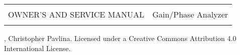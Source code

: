 \begin{titlingpage}
\begin{tabularx}{\textwidth}{Xr}
\hline
\\
{\LARGE OWNER'S AND SERVICE MANUAL} &
Gain/Phase Analyzer \\
\\
\hline
\end{tabularx}
\vfill
\begin{center}
\end{center}
\vfill
\begin{center}
, Christopher Pavlina. Licensed under a Creative Commons Attribution 4.0 International License.
\end{center}
\end{titlingpage}
